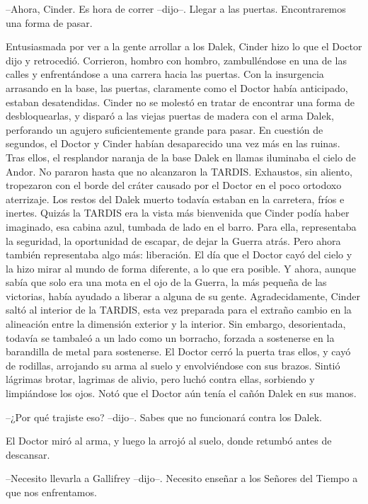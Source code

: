 --Ahora, Cinder. Es hora de correr --dijo--. Llegar a las puertas. Encontraremos una forma de pasar.

Entusiasmada por ver a la gente arrollar a los Dalek, Cinder hizo lo que el Doctor dijo y retrocedió. Corrieron, hombro con hombro, zambulléndose en una de las calles y enfrentándose a una carrera hacia las puertas.
Con la insurgencia arrasando en la base, las puertas, claramente como el Doctor había anticipado, estaban desatendidas. Cinder no se molestó en tratar de encontrar una forma de desbloquearlas, y disparó a las viejas puertas de madera con el arma Dalek, perforando un agujero suficientemente grande para pasar.
En cuestión de segundos, el Doctor y Cinder habían desaparecido una vez más en las ruinas. Tras ellos, el resplandor naranja de la base Dalek en llamas iluminaba el cielo de Andor.
No pararon hasta que no alcanzaron la TARDIS. Exhaustos, sin aliento, tropezaron con el borde del cráter causado por el Doctor en el poco ortodoxo aterrizaje. Los restos del Dalek muerto todavía estaban en la carretera, fríos e inertes.
Quizás la TARDIS era la vista más bienvenida que Cinder podía haber imaginado, esa cabina azul, tumbada de lado en el barro. Para ella, representaba la seguridad, la oportunidad de escapar, de dejar la Guerra atrás. Pero ahora también representaba algo más: liberación. El día que el Doctor cayó del cielo y la hizo mirar al mundo de forma diferente, a lo que era posible. Y ahora, aunque sabía que solo era una mota en el ojo de la Guerra, la más pequeña de las victorias, había ayudado a liberar a alguna de su gente.
Agradecidamente, Cinder saltó al interior de la TARDIS, esta vez preparada para el extraño cambio en la alineación entre la dimensión exterior y la interior. Sin embargo, desorientada, todavía se tambaleó a un lado como un borracho, forzada a sostenerse en la barandilla de metal para sostenerse.
El Doctor cerró la puerta tras ellos, y cayó de rodillas, arrojando su arma al suelo y envolviéndose con sus brazos. Sintió lágrimas brotar, lagrimas de alivio, pero luchó contra ellas, sorbiendo y limpiándose los ojos.
Notó que el Doctor aún tenía el cañón Dalek en sus manos. 

--¿Por qué trajiste eso? --dijo--. Sabes que no funcionará contra los Dalek. 

El Doctor miró al arma, y luego la arrojó al suelo, donde retumbó antes de descansar. 

--Necesito llevarla a Gallifrey --dijo--. Necesito enseñar a los Señores del Tiempo a que nos enfrentamos. 

